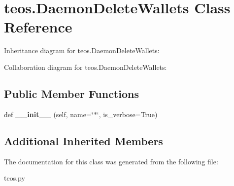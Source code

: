 \hypertarget{classteos_1_1DaemonDeleteWallets}{}\section{teos.\+Daemon\+Delete\+Wallets Class Reference}
\label{classteos_1_1DaemonDeleteWallets}


Inheritance diagram for teos.\+Daemon\+Delete\+Wallets\+:


Collaboration diagram for teos.\+Daemon\+Delete\+Wallets\+:
\subsection*{Public Member Functions}
\begin{DoxyCompactItemize}
\item 
\mbox{\label{classteos_1_1DaemonDeleteWallets_ae80e54bc5b8878975ede8fc7c278259c}} 
def {\bfseries \+\_\+\+\_\+init\+\_\+\+\_\+} (self, name=\char`\"{}$\ast$\char`\"{}, is\+\_\+verbose=True)
\end{DoxyCompactItemize}
\subsection*{Additional Inherited Members}


The documentation for this class was generated from the following file\+:\begin{DoxyCompactItemize}
\item 
teos.\+py\end{DoxyCompactItemize}

